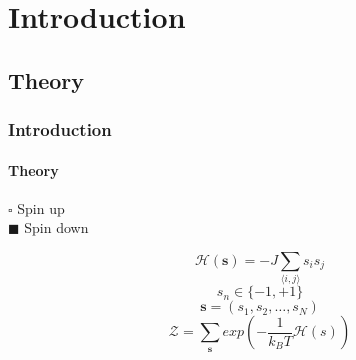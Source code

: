 

\begin{frame}
	\titlepage
\end{frame}

\begin{frame}
	\tableofcontents
\end{frame}

\section{Introduction}
\subsection{Theory}
\begin{frame}
	\frametitle{Introduction}
	\framesubtitle{Theory}
	\begin{minipage}{.6\textwidth}
			\begin{center}
		\end{center}
	\end{minipage}%
	\begin{minipage}[]{.4\textwidth}
		$ \square $ Spin up \\ 
		$ \blacksquare $ Spin down 
	\end{minipage}
	\vspace{-.05cm}
	\begin{equation}
		 \mathcal{H}(\textbf{s}) = -J \sum_{\langle i, j \rangle} s_{i} s_{j}
	\end{equation}
	{\scriptsize \begin{equation*}
		 s_{n} \in \{-1,+1\}
	\end{equation*}}\vspace{-.5cm}
	\begin{equation}
		\textbf{s} = (s_{1}, s_{2}, \dots, s_{N})
	\end{equation}
	\begin{equation}
		\mathcal{Z} = \sum_{\textbf{s}} exp(-\frac{1}{k_{B} T}\mathcal{H}(s))
	\end{equation}
	

\end{frame}
